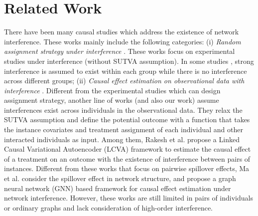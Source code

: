 \vspace{-2mm}
\section{Related Work}
\vspace{-1mm}
 There have been many causal studies \cite{aronow2017estimating,basse2018analyzing,imai2020causal,kohavi2013online,tchetgen2012causal,ugander2013graph,yuan2021causal,ma2021causal,bhattacharya2020causal} which address the existence of network interference. These works mainly include the following categories: (i) \textit{Random assignment strategy under interference} \cite{aronow2017estimating,basse2018analyzing,imai2020causal,ugander2013graph,fatemi2020minimizing}. These works focus on experimental studies under interference (without SUTVA assumption). %
In some studies \cite{karrer2021network}, strong interference is assumed to exist within each group while there is no interference across different groups; (ii) \textit{Causal effect estimation on observational data with interference} \cite{rakesh2018linked,ma2021causal,arbour2016inferring,tchetgen2021auto}. Different from the experimental studies which can design assignment strategy, another line of works (and also our work) assume interferences exist across individuals in the observational data. They relax the SUTVA assumption and define the potential outcome with a function that takes the instance covariates and treatment assignment of each individual and other interacted individuals as input. Among them, Rakesh et al. \cite{rakesh2018linked} propose a Linked
Causal Variational Autoencoder (LCVA) framework to estimate the causal effect of a treatment on an outcome with the existence of interference between pairs of instances. Different from these works that focus on pairwise spillover effects, Ma et al. \cite{ma2021causal} consider the spillover effect in network structure, and propose a graph neural network (GNN) \cite{kipf2016semi} based framework for causal effect estimation under network interference. %
However, these works are still limited in pairs of individuals or ordinary graphs and lack consideration of high-order interference.
